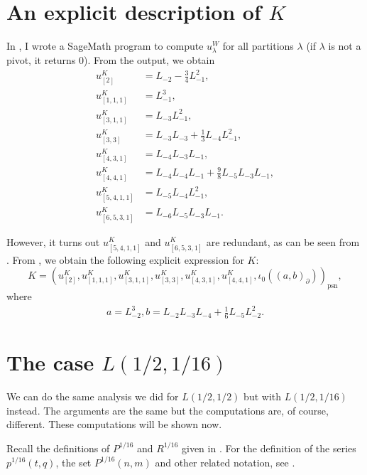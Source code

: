 \documentclass[a4paper, 12pt, reqno]{amsart}
\theoremstyle{remark}
\numberwithin{equation}{subsection}
\DeclareMathOperator{\psn}{psn}
\begin{document}
\section{An explicit description of $K$}
\label{sec:an-expl-descr}

In \cite[ising-modules.ipynb]{sagemath2}, I wrote a SageMath program to compute $u^W_\lambda$ for all partitions $\lambda$ (if $\lambda$ is not a pivot, it returns $0$).
From the output, we obtain
\begin{align*}
  u^K_{[2]} &= L_{-2} - \tfrac{3}{4}L_{-1}^2, \\
  u^K_{[1, 1, 1]} &= L_{-1}^3, \\
  u^K_{[3, 1, 1]} &= L_{-3}L_{-1}^2, \\
  u^K_{[3, 3]} &= L_{-3}L_{-3} + \tfrac{1}{3}L_{-4}L_{-1}^2, \\
  u^K_{[4, 3, 1]} &= L_{-4}L_{-3}L_{-1}, \\
  u^K_{[4, 4, 1]} &= L_{-4}L_{-4}L_{-1} + \tfrac{9}{8}L_{-5}L_{-3}L_{-1}, \\
  u^K_{[5, 4, 1, 1]} &= L_{-5}L_{-4}L_{-1}^2, \\
  u^K_{[6, 5, 3, 1]} &= L_{-6}L_{-5}L_{-3}L_{-1}.
\end{align*}

However, it turns out $u^K_{[5, 4, 1, 1]}$ and $u^K_{[6, 5, 3, 1]}$ are redundant, as can be seen from \cite[m11-m15.ipynb]{sagemath2}.
From \cite[Theorem 2]{andrews_singular_2022}, we obtain the following explicit expression for $K$:
\begin{equation*}
  K = (u^K_{[2]}, u^K_{[1, 1, 1]}, u^K_{[3, 1, 1]}, u^K_{[3, 3]}, u^K_{[4, 3, 1]}, u^K_{[4, 4, 1]}, \iota_0((a, b)_\partial))_{\psn},
\end{equation*}
where
\begin{align*}
  a = L_{-2}^3, b = L_{-2}L_{-3}L_{-4} + \tfrac{1}{6}L_{-5}L_{-2}^2.
\end{align*}


\section{The case $L(1/2, 1/16)$}
\label{sec:case-l12-116}

We can do the same analysis we did for $L(1/2, 1/2)$ but with $L(1/2, 1/16)$ instead.
The arguments are the same but the computations are, of course, different.
These computations will be shown now.

Recall the definitions of $P^{1/16}$ and $R^{1/16}$ given in .
For the definition of the series $p^{1/16}(t, q)$, the set $P^{1/16}(n, m)$ and other related notation, see .
\end{document}
